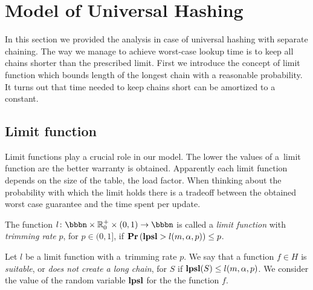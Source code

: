 \section{Model of Universal Hashing}
\label{section-model}
In this section we provided the analysis in case of universal hashing with separate chaining. 
The way we manage to achieve worst-case lookup time is to keep all chains shorter than the prescribed limit. 
First we introduce the concept of limit function which bounds length of the longest chain with a reasonable probability. 
It turns out that time needed to keep chains short can be amortized to a constant.

\subsection{Limit function}
Limit functions play a crucial role in our model. 
The lower the values of a~limit function are the better warranty is obtained. Apparently each limit function depends on the size of the table, the load factor. 
When thinking about the probability with which the limit holds there is a tradeoff between the obtained worst case guarantee and the time spent per update.

\begin{definition}
\label{definition-limit-function}
The function $l\colon \bbbn \times \mathbb{R}_0^+ \times (0, 1) \rightarrow \bbbn$ is called a \emph{limit function} with \emph{trimming rate} $p$, for $p \in (0, 1]$, if $\mathbf{Pr}\left(\mathbf{lpsl} > l(m, \alpha, p)\right) \leq p$.

Let $l$ be a limit function with a~trimming rate $p$.
We say that a function $f \in H$ is \emph{suitable}, or \emph{does not create a long chain}, for $S$ if $\mathbf{lpsl}(S) \le l(m, \alpha, p)$. 
We consider the value of the random variable $\mathbf{lpsl}$ for the the function $f$.
\end{definition}

